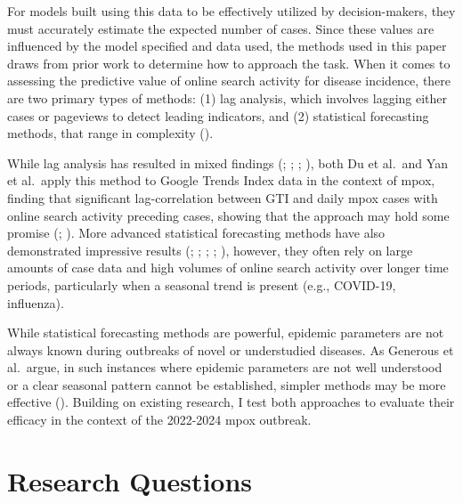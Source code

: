 \documentclass[
  12pt,
]{article}
\begin{document}
For models built using this data to be effectively utilized by
decision-makers, they must accurately estimate the expected number of
cases. Since these values are influenced by the model specified and data
used, the methods used in this paper draws from prior work to determine
how to approach the task. When it comes to assessing the predictive
value of online search activity for disease incidence, there are two
primary types of methods: (1) lag analysis, which involves lagging
either cases or pageviews to detect leading indicators, and (2)
statistical forecasting methods, that range in complexity
().

While lag analysis has resulted in mixed findings
(;
;
;
), both Du et al.~and Yan et
al.~apply this method to Google Trends Index data in the context of
mpox, finding that significant lag-correlation between GTI and daily
mpox cases with online search activity preceding cases, showing that the
approach may hold some promise (;
). More advanced statistical
forecasting methods have also demonstrated impressive results
(;
;
;
;
), however, they
often rely on large amounts of case data and high volumes of online
search activity over longer time periods, particularly when a seasonal
trend is present (e.g., COVID-19, influenza).

While statistical forecasting methods are powerful, epidemic parameters
are not always known during outbreaks of novel or understudied diseases.
As Generous et al.~argue, in such instances where epidemic parameters
are not well understood or a clear seasonal pattern cannot be
established, simpler methods may be more effective
(). Building on
existing research, I test both approaches to evaluate their efficacy in
the context of the 2022-2024 mpox outbreak.

\section{Research Questions}\label{research-questions}
\end{document}

